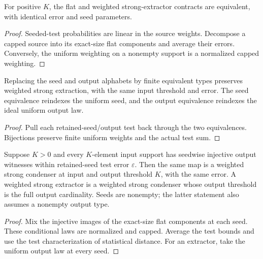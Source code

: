 \begin{theorem}
  \label{thm:lowerbounds-algebraic-weighted-strong}
  \leanok
  For positive $K$, the flat and weighted strong-extractor contracts are
  equivalent, with identical error and seed parameters.
\end{theorem}
\begin{proof}
  \leanok
  Seeded-test probabilities are linear in the source weights. Decompose a
  capped source into its exact-size flat components and average their
  errors. Conversely, the uniform weighting on a nonempty support is a
  normalized capped weighting.
\end{proof}

\begin{theorem}
  \label{thm:lowerbounds-algebraic-weighted-strong-equiv}
  \leanok
  Replacing the seed and output alphabets by finite equivalent types
  preserves weighted strong extraction, with the same input threshold and
  error. The seed equivalence reindexes the uniform seed, and the output
  equivalence reindexes the ideal uniform output law.
\end{theorem}
\begin{proof}
  \leanok
  Pull each retained-seed/output test back through the two equivalences.
  Bijections preserve finite uniform weights and the actual test sum.
\end{proof}

\begin{theorem}
  \label{thm:lowerbounds-algebraic-weighted-condenser}
  \leanok
  Suppose $K>0$ and every $K$-element input support has seedwise injective
  output witnesses within retained-seed test error $\varepsilon$. Then the
  same map is a weighted strong condenser at input and output threshold $K$,
  with the same error. A weighted strong extractor is a weighted strong
  condenser whose output threshold is the full output cardinality.
  Seeds are nonempty; the latter statement also assumes a nonempty output type.
\end{theorem}
\begin{proof}
  \leanok
  Mix the injective images of the exact-size flat components at each seed.
  These conditional laws are normalized and capped. Average the test
  bounds and use the test characterization of statistical distance. For
  an extractor, take the uniform output law at every seed.
\end{proof}

